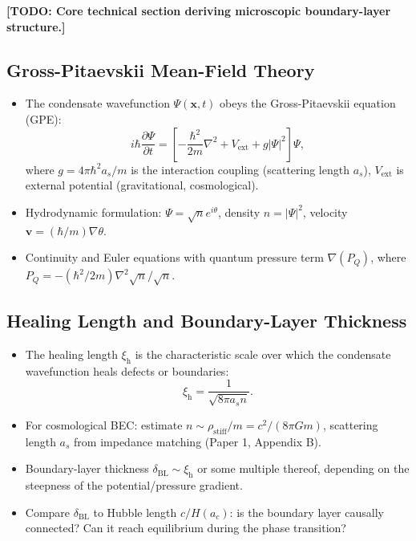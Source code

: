 \documentclass[11pt,a4paper]{article}
\newcommand{\rhostiff}{\ensuremath{\rho_{\mathrm{stiff}}}}
\newcommand{\ac}{\ensuremath{a_c}}
\newcommand{\xih}{\ensuremath{\xi_{\mathrm{h}}}}
\newcommand{\deltaBL}{\ensuremath{\delta_{\mathrm{BL}}}}
\theoremstyle{definition}
\theoremstyle{remark}
\begin{document}
\textbf{[TODO: Core technical section deriving microscopic boundary-layer structure.]}

\subsection{Gross-Pitaevskii Mean-Field Theory}
\label{sec:gp_theory}

\begin{itemize}[leftmargin=*, itemsep=0.3em]
\item The condensate wavefunction $\Psi(\mathbf{x},t)$ obeys the Gross-Pitaevskii equation (GPE):
\begin{equation}
i\hbar\frac{\partial\Psi}{\partial t} = \left[ -\frac{\hbar^2}{2m}\nabla^2 + V_{\mathrm{ext}} + g|\Psi|^2 \right]\Psi,
\label{eq:gpe}
\end{equation}
where $g = 4\pi\hbar^2 a_s/m$ is the interaction coupling (scattering length $a_s$), $V_{\mathrm{ext}}$ is external potential (gravitational, cosmological).
\item Hydrodynamic formulation: $\Psi = \sqrt{n} e^{i\theta}$, density $n = |\Psi|^2$, velocity $\mathbf{v} = (\hbar/m)\nabla\theta$.
\item Continuity and Euler equations with quantum pressure term $\nabla(P_Q)$, where $P_Q = -(\hbar^2/2m)\nabla^2\sqrt{n}/\sqrt{n}$.
\end{itemize}

\subsection{Healing Length and Boundary-Layer Thickness}
\label{sec:healing_length}

\begin{itemize}[leftmargin=*, itemsep=0.3em]
\item The healing length $\xih$ is the characteristic scale over which the condensate wavefunction heals defects or boundaries:
\begin{equation}
\xih = \frac{1}{\sqrt{8\pi a_s n}}.
\label{eq:healing_length}
\end{equation}
\item For cosmological BEC: estimate $n \sim \rhostiff/m = c^2/(8\pi G m)$, scattering length $a_s$ from impedance matching (Paper 1, Appendix B).
\item Boundary-layer thickness $\deltaBL \sim \xih$ or some multiple thereof, depending on the steepness of the potential/pressure gradient.
\item Compare $\deltaBL$ to Hubble length $c/H(\ac)$: is the boundary layer causally connected? Can it reach equilibrium during the phase transition?
\end{itemize}
\end{document}
